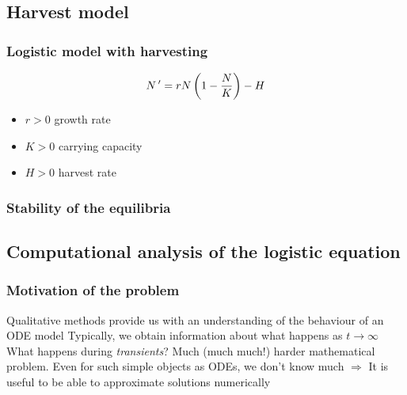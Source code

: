 \documentclass[aspectratio=169]{beamer}
\begin{document}
\subsection{Harvest model}


\begin{frame}\frametitle{Logistic model with harvesting}
\begin{equation}\label{eq:logistic-ODE-with-harvesting}
N\,' = rN\left(1-\frac{N}{K}\right)-H
\end{equation}
\vfill
\begin{itemize}
\item $r>0$ growth rate
\item $K>0$ carrying capacity
\item $H>0$ harvest rate
\end{itemize}
\end{frame}

\begin{frame}\frametitle{Stability of the equilibria}
\begin{center}
\end{center}
\end{frame}



\subsection{Computational analysis of the logistic equation}

\begin{frame}\frametitle{Motivation of the problem}
Qualitative methods provide us with an understanding of the behaviour of an ODE model
\vfill
Typically, we obtain information about what happens as $t\to\infty$
\vfill
What happens during \emph{transients}? Much (much much!) harder mathematical problem. Even for such simple objects as ODEs, we don't know much
\vfill
$\Rightarrow$ It is useful to be able to approximate solutions numerically
\end{frame}
\end{document}
